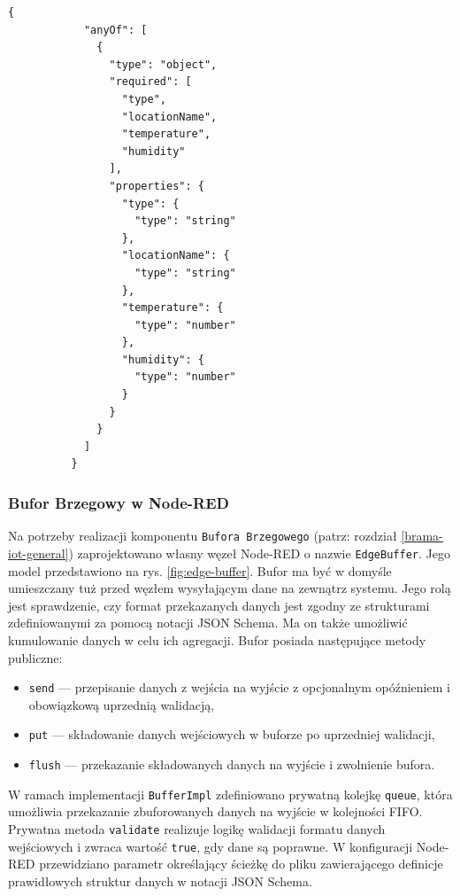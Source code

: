 \documentclass[a4paper, 12pt, twoside]{article}
\begin{document}
\begin{lstlisting}[caption={Przykład definicji obiektu JSON w notacji JSON Schema dla 
      struktury \texttt{AirMeasurement}}, label={lst:json-schema}]
      {
            "anyOf": [
              {
                "type": "object",
                "required": [
                  "type",
                  "locationName",
                  "temperature",
                  "humidity"
                ],
                "properties": {
                  "type": {
                    "type": "string"
                  },
                  "locationName": {
                    "type": "string"
                  },
                  "temperature": {
                    "type": "number"
                  },
                  "humidity": {
                    "type": "number"
                  }
                }
              }
            ]
          }    
\end{lstlisting}

\subsubsection{Bufor Brzegowy w Node-RED}
Na potrzeby realizacji komponentu \texttt{Bufora Brzegowego} (patrz: rozdział \ref{brama-iot-general})
zaprojektowano własny węzeł Node-RED o nazwie \texttt{EdgeBuffer}.
Jego model przedstawiono na rys. \ref{fig:edge-buffer}.
Bufor ma być w domyśle umieszczany tuż przed węzłem wysyłającym dane na
zewnątrz systemu. Jego rolą jest sprawdzenie, czy format
przekazanych danych jest zgodny ze strukturami zdefiniowanymi za pomocą notacji JSON Schema.
Ma on także umożliwić
kumulowanie danych w celu ich agregacji. Bufor posiada następujące
metody publiczne:
\begin{itemize}
      \itemsep0em
      \item \texttt{send} --- przepisanie danych z wejścia na wyjście z
            opcjonalnym opóźnieniem i obowiązkową uprzednią walidacją,
      \item \texttt{put} --- składowanie danych wejściowych w buforze po uprzedniej walidacji,
      \item \texttt{flush} --- przekazanie składowanych danych na wyjście
            i zwolnienie bufora.
\end{itemize}
\noindent W ramach implementacji \texttt{BufferImpl} zdefiniowano
prywatną kolejkę \texttt{queue}, która umożliwia przekazanie zbuforowanych
danych na wyjście w kolejności FIFO. Prywatna metoda \texttt{validate} realizuje
logikę walidacji formatu danych wejściowych i zwraca wartość \texttt{true},
gdy dane są poprawne. W konfiguracji Node-RED przewidziano parametr określający
ścieżkę do pliku zawierającego definicje prawidłowych struktur danych w notacji JSON Schema.
\end{document}
